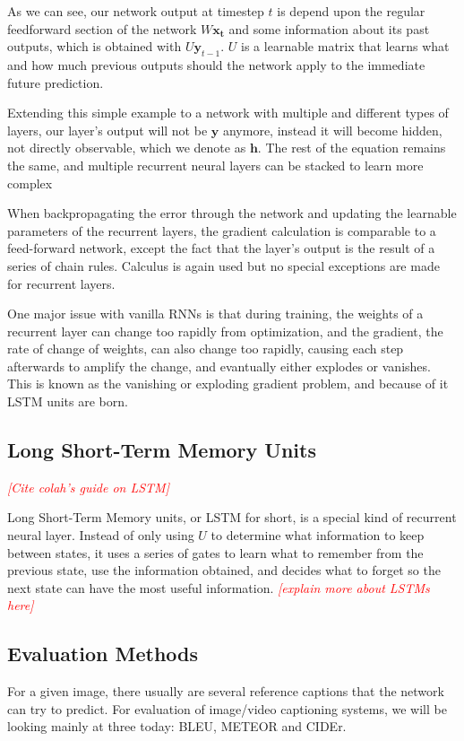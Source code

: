\documentclass[10pt,twocolumn,letterpaper]{article}
\newcommand{\todo}[1]{\textcolor{red}{{\em [#1]}} }
\newcommand{\matr}[1]{\mathbf{#1}}
\newcommand{\bs}[1]{\boldsymbol{#1}}
\begin{document}
As we can see, our network output at timestep $t$ is depend upon the regular
feedforward section of the network $W \matr{x_{t}}$ and some information about
its past outputs, which is obtained with $U \bs{y}_{t-1}$. $U$ is a
learnable matrix that learns what and how much previous outputs should the
network apply to the immediate future prediction.

Extending this simple example to a network with multiple and different types
of layers, our layer's output will not be $\bs{y}$ anymore, instead it
will become hidden, not directly observable, which we denote as
$\bs{h}$. The rest of the equation remains the same, and multiple
recurrent neural layers can be stacked to learn more complex 

When backpropagating the error through the network and updating the learnable
parameters of the recurrent layers, the gradient calculation is comparable to
a feed-forward network, except the fact that the layer's output is the result
of a series of chain rules. Calculus is again used but no special exceptions
are made for recurrent layers.

One major issue with vanilla RNNs is that during training, the weights of a
recurrent layer can change too rapidly from optimization, and the gradient,
the rate of change of weights, can also change too rapidly, causing each step
afterwards to amplify the change, and evantually either explodes or vanishes.
This is known as the vanishing or exploding gradient problem, and because of
it LSTM units are born.

\subsection{Long Short-Term Memory Units}
\todo{Cite colah's guide on LSTM}

Long Short-Term Memory units, or LSTM for short, is a special kind of
recurrent neural layer. Instead of only using $U$ to determine what
information to keep between states, it uses a series of gates to learn what to
remember from the previous state, use the information obtained, and decides
what to forget so the next state can have the most useful information.
\todo{explain more about LSTMs here}

\subsection{Evaluation Methods}
For a given image, there usually are several reference captions that the
network can try to predict. For evaluation of image/video captioning systems,
we will be looking mainly at three today: BLEU, METEOR and CIDEr.
\end{document}
